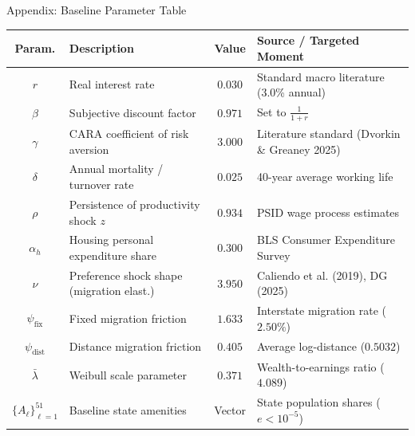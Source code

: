 \documentclass[aspectratio=169, 10pt]{beamer}
\begin{document}
\begin{frame}{Appendix: Baseline Parameter Table \hfill \hyperlink{main:calibration}{\scriptsize{}}}\label{backup:param_table}
    \centering
    \scriptsize
    \setlength{\tabcolsep}{3.5pt}
    \begin{tabular}{clcl}
        \toprule
        \textbf{Param.} & \textbf{Description} & \textbf{Value} & \textbf{Source / Targeted Moment} \\
        \midrule
        $r$ & Real interest rate & $0.030$ & Standard macro literature (3.0\% annual) \\
        $\beta$ & Subjective discount factor & $0.971$ & Set to $\frac{1}{1+r}$ \\
        $\gamma$ & CARA coefficient of risk aversion & $3.000$ & Literature standard (Dvorkin \& Greaney 2025) \\
        $\delta$ & Annual mortality / turnover rate & $0.025$ & 40-year average working life \\
        $\rho$ & Persistence of productivity shock $z$ & $0.934$ & PSID wage process estimates \\
        $\alpha_h$ & Housing personal expenditure share & $0.300$ & BLS Consumer Expenditure Survey \\
        $\nu$ & Preference shock shape (migration elast.) & $3.950$ & Caliendo et al. (2019), DG (2025) \\
        \midrule
        $\psi_{\text{fix}}$ & Fixed migration friction & $1.633$ & Interstate migration rate ($2.50\%$) \\
        $\psi_{\text{dist}}$ & Distance migration friction & $0.405$ & Average log-distance ($0.5032$) \\
        $\bar{\lambda}$ & Weibull scale parameter & $0.371$ & Wealth-to-earnings ratio ($4.089$) \\
        $\{A_\ell\}_{\ell=1}^{51}$ & Baseline state amenities & Vector & State population shares ($e < 10^{-5}$) \\
        \bottomrule
    \end{tabular}
\end{frame}
\end{document}
